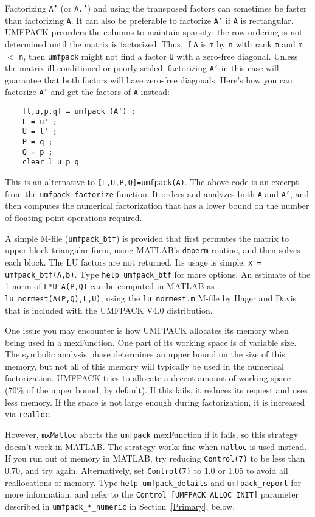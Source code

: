 Factorizing {\tt A'} (or {\tt A.'}) and using the transposed factors can
sometimes be faster than factorizing {\tt A}.  It can also be preferable to
factorize {\tt A'} if {\tt A} is rectangular.  UMFPACK preorders the columns
to maintain sparsity; the row ordering is not determined until the matrix
is factorized.  Thus, if {\tt A} is {\tt m} by {\tt n} with rank {\tt m}
and {\tt m} $<$ {\tt n}, then {\tt umfpack} might not find a factor
{\tt U} with a zero-free diagonal.  Unless the matrix ill-conditioned or
poorly scaled, factorizing {\tt A'} in this case will guarantee that both
factors will have zero-free diagonals.  Here's how you can factorize {\tt A'}
and get the factors of {\tt A} instead:
%
{\footnotesize
\begin{verbatim}
    [l,u,p,q] = umfpack (A') ;
    L = u' ;
    U = l' ;
    P = q ;
    Q = p ;
    clear l u p q
\end{verbatim}
}
%
This is an alternative to {\tt [L,U,P,Q]=umfpack(A)}.
The above code is an excerpt from the {\tt umfpack\_factorize} function.
It orders and analyzes both {\tt A} and {\tt A'}, and then computes
the numerical factorization that has a lower bound on the number of
floating-point operations required.

A simple M-file ({\tt umfpack\_btf}) is provided that first permutes the matrix
to upper block triangular form, using MATLAB's {\tt dmperm} routine, and then
solves each block.
The LU factors are not returned.  Its usage is simple:
        {\tt x = umfpack\_btf(A,b)}.
Type {\tt help umfpack\_btf} for more options.
An estimate of the 1-norm of {\tt L*U-A(P,Q)} can be computed in MATLAB
as {\tt lu\_normest(A(P,Q),L,U)}, using the {\tt lu\_normest.m} M-file
by Hager and Davis \cite{DavisHager99} that is included with the
UMFPACK V4.0 distribution.

One issue you may encounter is how UMFPACK allocates its memory when being used
in a mexFunction.  One part of its working space is of variable size.   The
symbolic analysis phase determines an upper bound on the size of this memory,
but not all of this memory will typically be used in the numerical
factorization.  UMFPACK tries to allocate a decent amount of working space
(70\% of the upper bound, by default).  If this fails, it reduces its request
and uses less memory.   If the space is not large enough during factorization,
it is increased via {\tt realloc}.

However, {\tt mxMalloc} aborts the {\tt umfpack} mexFunction
if it fails, so this strategy doesn't work in MATLAB.  The strategy works fine
when {\tt malloc} is used instead.  If you run out of memory in MATLAB, try
reducing {\tt Control(7)} to be less than 0.70, and try again.
Alternatively, set {\tt Control(7)} to 1.0 or 1.05 to avoid all reallocations
of memory.
Type {\tt help umfpack\_details} and {\tt umfpack\_report} for more
information, and refer to the {\tt Control [UMFPACK\_ALLOC\_INIT]} parameter
described in {\tt umfpack\_*\_numeric} in Section~\ref{Primary}, below.

